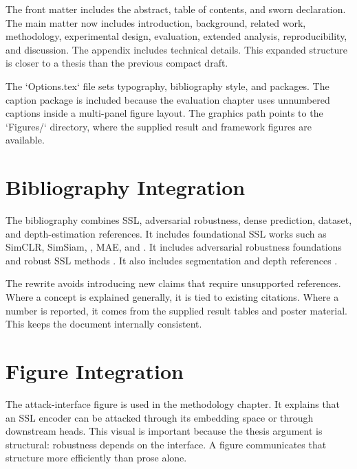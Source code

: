 The front matter includes the abstract, table of contents, and sworn declaration. The main matter now includes introduction, background, related work, methodology, experimental design, evaluation, extended analysis, reproducibility, and discussion. The appendix includes technical details. This expanded structure is closer to a thesis than the previous compact draft.

The `Options.tex` file sets typography, bibliography style, and packages. The caption package is included because the evaluation chapter uses unnumbered captions inside a multi-panel figure layout. The graphics path points to the `Figures/` directory, where the supplied result and framework figures are available.

\section{Bibliography Integration}

The bibliography combines SSL, adversarial robustness, dense prediction, dataset, and depth-estimation references. It includes foundational SSL works such as SimCLR, SimSiam, \DINO, MAE, and \DINOv \parencite{chen2020simple,simsiam,caron2021dino,mae,oquab2024dinov2}. It includes adversarial robustness foundations and robust SSL methods \parencite{biggio2013evasion,szegedy2014intriguing,madry2018towards,kim2020adversarial,jiang2020robust,fan2021does,zhang2022decoupled,luo2023rethinking}. It also includes segmentation and depth references \parencite{long2017segmentation,xiao2018unified,godard2019depthestimation,MegaDepthLi18,AdaBins}.

The rewrite avoids introducing new claims that require unsupported references. Where a concept is explained generally, it is tied to existing citations. Where a number is reported, it comes from the supplied result tables and poster material. This keeps the document internally consistent.

\section{Figure Integration}

The attack-interface figure is used in the methodology chapter. It explains that an SSL encoder can be attacked through its embedding space or through downstream heads. This visual is important because the thesis argument is structural: robustness depends on the interface. A figure communicates that structure more efficiently than prose alone.

